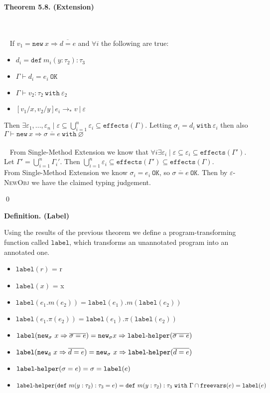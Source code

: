 \documentclass{llncs}
\newcommand{\keywadj}[1]{\mathtt{#1}}
\newcommand{\keyw}[1]{\keywadj{#1}~}
\newcommand{\hyphen}{\hbox{-}}
\newcommand{\thm}[3]{
	\begin{large}
		\bf{#1}
	\end{large} \\\\
	\fbox{Statement.} ~ #2
	\fbox{Proof.}~ #3 \qed
}
\begin{document}
\thm{Theorem 5.8. (Extension)}
{If  $v_1 = \keyw{new} x \Rightarrow \overline{d = e}$ and $\forall i$ the following are true:
	\begin{itemize}
		\item $d_i = \keyw{def} m_i(y: \tau_2) : \tau_3$
		\item $\Gamma \vdash d_i = e_i~\keywadj{OK}$
		\item $\Gamma \vdash v_2 : \tau_2~\keyw{with} \varepsilon_2$
		\item $[v_1/x, v_2/y]e_i \longrightarrow_* v~|~\varepsilon$
	\end{itemize}
	Then $\exists \varepsilon_1, ..., \varepsilon_n \mid \varepsilon \subseteq \bigcup\limits_{i=1}^{n} \varepsilon_i \subseteq \keywadj{effects}(\Gamma)$. Letting $\sigma_i = d_i~\keyw{with} \varepsilon_i$ then also $\Gamma \vdash \keyw{new} x \Rightarrow \overline{\sigma = e}~\keyw{with~\varnothing}$ \\\\}
{From Single-Method Extension we know that  $\forall i \exists \varepsilon_i \mid \varepsilon \subseteq \varepsilon_i \subseteq \keywadj{effects}(\Gamma')$. Let $\Gamma' = \bigcup\limits_{i=1}^{n} \Gamma_i'$. Then $\bigcup\limits_{i=1}^{n} \varepsilon_i \subseteq \keywadj{effects}(\Gamma') \subseteq \keywadj{effects}(\Gamma)$. \\
	
\noindent
From Single-Method Extension we know $\sigma_i = e_i~\keywadj{OK}$, so $\overline{\sigma = e}~\keywadj{OK}$. Then by \textsc{$\varepsilon$-NewObj} we have the claimed typing judgement.
	
	}

\begin{large}
\bf{Definition. (Label)}
\end{large}

\noindent
Using the results of the previous theorem we define a program-transforming function called $\keywadj{label}$, which transforms an unannotated program into an annotated one.

\begin{itemize}
	\item $\keywadj{label}(r)$ = r
	\item $\keywadj{label}(x)$ = x
	\item $\keywadj{label}(e_1.m(e_2)) = \keywadj{label}(e_1).m(\keywadj{label}(e_2))$
	\item $\keywadj{label}(e_1.\pi(e_2)) = \keywadj{label}(e_1).\pi(\keywadj{label}(e_2))$
	\item $\keywadj{label}(\keyw{new_\sigma} x \Rightarrow \overline{\sigma = e}) = \keywadj{new}_\sigma x \Rightarrow \keywadj{label \hyphen helper}(\overline{\sigma = e})$
	\item $\keywadj{label}(\keyw{new_d} x \Rightarrow \overline{d = e}) = \keyw{new_\sigma} x \Rightarrow \keywadj{label \hyphen helper}(\overline{d = e})$
	\item $\keywadj{label \hyphen helper}(\sigma = e) = \sigma = \keywadj{label}(e)$
	\item $\keywadj{label \hyphen helper}(\keywadj{def}~m(y : \tau_2) : \tau_3 = e) = \keywadj{def}~m(y : \tau_2) : \tau_3~\keyw{with} \Gamma \cap \keywadj{freevars}(e) = \keywadj{label}(e)$
\end{itemize}
\end{document}
